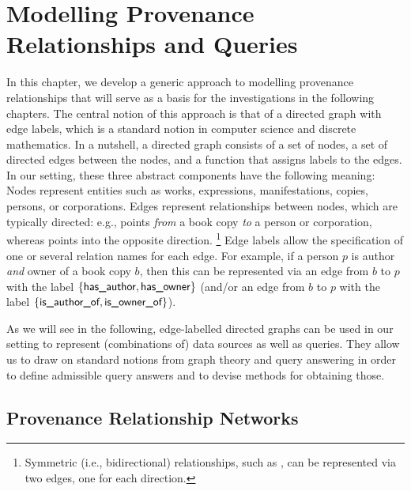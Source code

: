 
\chapter{Modelling Provenance Relationships and Queries}

In this chapter, we develop a generic approach to modelling provenance relationships
that will serve as a basis for the investigations in the following chapters.
The central notion of this approach is that of a directed graph with edge labels,
which is a standard notion in computer science and discrete mathematics.
In a nutshell, a directed graph consists of a set of nodes, a set of directed edges between
the nodes, and a function that assigns labels to the edges.
In our setting, these three abstract components have the following meaning:
Nodes represent entities such as works, expressions, manifestations, copies,
persons, or corporations.
Edges represent relationships between nodes, which are typically directed:
e.g.,  points \emph{from} a book copy \emph{to} a person or corporation,
whereas  points into the opposite direction.%
\footnote{%
  Symmetric (i.e., bidirectional) relationships, such as ,
  can be represented via two edges, one for each direction.%
}
Edge labels allow the specification of one or several relation names for each edge.
For example, if a person $p$ is author \emph{and} owner of a book copy $b$,
then this can be represented via an edge from $b$ to $p$ with the label
$\{\textsf{has\_author},\textsf{has\_owner}\}$
(and/or an edge from $b$ to $p$ with the label $\{\textsf{is\_author\_of},\textsf{is\_owner\_of}\}$).

As we will see in the following, edge-labelled directed graphs can be used in our setting
to represent (combinations of) data sources as well as queries.
They allow us to draw on standard notions from graph theory and query answering
in order to define admissible query answers and to devise methods for obtaining those.

\section{Provenance Relationship Networks}

